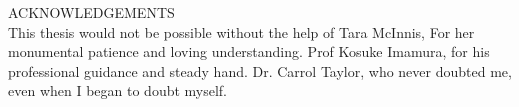 ACKNOWLEDGEMENTS\\

This thesis would not be possible without the help of Tara McInnis, For her monumental patience and loving understanding.  Prof Kosuke Imamura, for his professional guidance and steady hand.  Dr. Carrol Taylor, who never doubted me, even when I began to doubt myself.

\newpage
